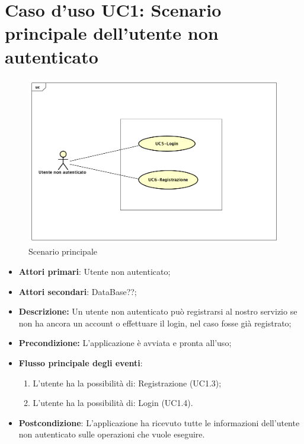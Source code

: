 \section{Caso d'uso UC1: Scenario principale dell'utente non autenticato}
\begin{figure}[!ht]
	\centering
	\includegraphics[scale=0.4]{Diagram/UC1.png}
	\caption{Scenario principale}\label{}
\end{figure}
\begin{itemize}
	\item \textbf{Attori primari}: Utente non autenticato;
	\item \textbf{Attori secondari}: DataBase??;
	\item \textbf{Descrizione:} Un utente non  autenticato può registrarsi al nostro servizio se non ha ancora un account o effettuare il login, nel caso fosse già registrato;
	\item \textbf{Precondizione:} L'applicazione è avviata e pronta all'uso;
	\item \textbf{Flusso principale degli eventi}:
	\begin{enumerate}
		\item L'utente ha la possibilità di: Registrazione (UC1.3);
		\item L'utente ha la possibilità di: Login (UC1.4).
	\end{enumerate}
	\item \textbf{Postcondizione}: L'applicazione ha ricevuto tutte le informazioni dell'utente non autenticato sulle operazioni che vuole eseguire.
\end{itemize}
